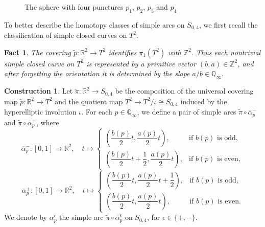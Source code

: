 \documentclass[11pt,a4paper,reqno]{amsart}%
\theoremstyle{plain}
\newtheorem{Fact}[Fact]{Fact}
\theoremstyle{definition}
\newtheorem{construction}[construction]{Construction}
\numberwithin{equation}{section}
\numberwithin{equation}{section}
\newcommand{\QQi}{\mathbb{Q}_\infty}
\begin{document}
\begin{figure}[h]
  \caption{The sphere with four punctures $p_1$, $p_2$, $p_3$ and  $p_4$}
     \label{fig:sphere}
 \end{figure}
  


 
 To better describe the homotopy classes of simple arcs on  $S_{0,4}$, we first recall the classification of simple closed curves on  $T^2$.

 \begin{Fact}
The covering $\tilde{p} \colon\mathbb{R}^2\to T^2$ identifies $\pi_1(T^2)$ with $\mathbb{Z}^2$. Thus each nontrivial simple closed curve on $T^2$ is represented by a primitive vector $(b,a)\in\mathbb{Z}^2$, and after forgetting the orientation it is determined by the slope $a/b\in\QQi$.
\end{Fact}  

\begin{construction}  \label{arcs pair}
Let $\tilde{\pi} \colon\mathbb{R}^2 \to S_{0,4} $  be the composition of the universal covering map  $\tilde{p} \colon\mathbb{R}^2 \to T^2$  and the quotient map   $T^2 \to T^2 / \iota \cong S_{0,4}$ induced by the hyperelliptic involution $\iota$.
 For each $p \in \QQi$, 
 we define a pair of simple arcs  $\tilde{\pi}\circ \overline{\alpha}_p^-$ and $\tilde{\pi}\circ \overline{\alpha}_p^+$, where  
\[
\overline{\alpha}_p^- : [0,1] \to \mathbb{R}^2, \quad t \mapsto
\begin{cases}
\left( \dfrac{b(p)}{2}t, \dfrac{a(p)}{2}t \right), & \text{if } b(p) \text{ is odd}, \\
\left( \dfrac{b(p)}{2}t+\dfrac{1}{2}, \dfrac{a(p)}{2}t \right), & \text{if } b(p) \text{ is even},
\end{cases}
\]
\[
\overline{\alpha}_p^+ : [0,1] \to \mathbb{R}^2, \quad t \mapsto
\begin{cases}
\left( \dfrac{b(p)}{2}t, \dfrac{a(p)}{2}t+\dfrac{1}{2} \right), & \text{if } b(p) \text{ is odd}, \\
\left( \dfrac{b(p)}{2}t, \dfrac{a(p)}{2}t \right), & \text{if } b(p) \text{ is even}.
\end{cases}
\] 
We denote by $\alpha_p^\epsilon$ the simple arc $\tilde{\pi}\circ\overline{\alpha}_p^\epsilon$ on $S_{0,4}$, for $\epsilon\in\{+,-\}$.
\end{construction}
\end{document}
